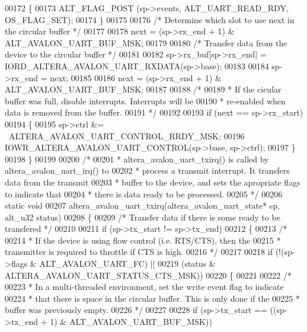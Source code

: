 \begin{DoxyCode}
00172   \{
00173     ALT_FLAG_POST (sp->events, ALT_UART_READ_RDY, OS\_FLAG\_SET);
00174   \}
00175 
00176   \textcolor{comment}{/* Determine which slot to use next in the circular buffer */}
00177 
00178   next = (sp->rx_end + 1) & ALT_AVALON_UART_BUF_MSK;
00179 
00180   \textcolor{comment}{/* Transfer data from the device to the circular buffer */}
00181 
00182   sp->rx\_buf[sp->rx_end] = IORD_ALTERA_AVALON_UART_RXDATA(sp->base);
00183 
00184   sp->rx_end = next;
00185 
00186   next = (sp->rx_end + 1) & ALT_AVALON_UART_BUF_MSK;
00187 
00188   \textcolor{comment}{/*}
00189 \textcolor{comment}{   * If the cicular buffer was full, disable interrupts. Interrupts will be}
00190 \textcolor{comment}{   * re-enabled when data is removed from the buffer.}
00191 \textcolor{comment}{   */}
00192 
00193   \textcolor{keywordflow}{if} (next == sp->rx_start)
00194   \{
00195     sp->ctrl &= ~ALTERA_AVALON_UART_CONTROL_RRDY_MSK;
00196     IOWR_ALTERA_AVALON_UART_CONTROL(sp->base, sp->ctrl); 
00197   \}   
00198 \}
00199 
00200 \textcolor{comment}{/*}
00201 \textcolor{comment}{ * altera\_avalon\_uart\_txirq() is called by altera\_avalon\_uart\_irq() to }
00202 \textcolor{comment}{ * process a transmit interrupt. It transfers data from the transmit }
00203 \textcolor{comment}{ * buffer to the device, and sets the apropriate flags to indicate that }
00204 \textcolor{comment}{ * there is data ready to be processed.}
00205 \textcolor{comment}{ */}
00206 \textcolor{keyword}{static} \textcolor{keywordtype}{void} 
00207 altera_avalon_uart_txirq(altera_avalon_uart_state* sp, alt_u32 status)
00208 \{
00209   \textcolor{comment}{/* Transfer data if there is some ready to be transfered */}
00210 
00211   \textcolor{keywordflow}{if} (sp->tx_start != sp->tx_end)
00212   \{
00213     \textcolor{comment}{/* }
00214 \textcolor{comment}{     * If the device is using flow control (i.e. RTS/CTS), then the}
00215 \textcolor{comment}{     * transmitter is required to throttle if CTS is high.}
00216 \textcolor{comment}{     */}
00217 
00218     \textcolor{keywordflow}{if} (!(sp->flags & ALT_AVALON_UART_FC) ||
00219       (status & ALTERA_AVALON_UART_STATUS_CTS_MSK))
00220     \{ 
00221 
00222       \textcolor{comment}{/*}
00223 \textcolor{comment}{       * In a multi-threaded environment, set the write event flag to indicate}
00224 \textcolor{comment}{       * that there is space in the circular buffer. This is only done if the}
00225 \textcolor{comment}{       * buffer was previously empty.}
00226 \textcolor{comment}{       */}
00227 
00228       \textcolor{keywordflow}{if} (sp->tx_start == ((sp->tx_end + 1) & ALT_AVALON_UART_BUF_MSK))

\end{DoxyCode}

